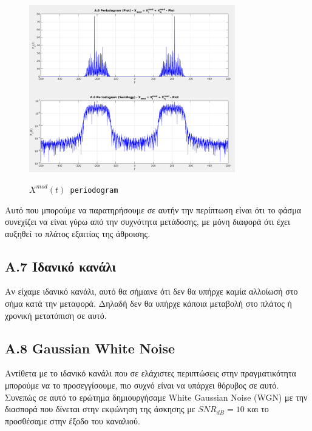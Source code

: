 \documentclass[11pt]{article}
\begin{document}
    \begin{figure}[H]
        \centering
        \includegraphics[scale=0.5, width=0.8\textwidth]{img/A6_mod_period.png} \\
        \caption{\texttt{$X^{mod}(t)$ periodogram}}
    \end{figure}
    
    \newpage \par \noindent
    Αυτό που μπορούμε να παρατηρήσουμε σε αυτήν την περίπτωση είναι ότι το φάσμα συνεχίζει να είναι γύρω από την συχνότητα μετάδοσης, με μόνη διαφορά ότι έχει αυξηθεί το πλάτος εξαιτίας της άθροισης.
    
    \subsection*{A.7 Ιδανικό κανάλι}
    Αν είχαμε ιδανικό κανάλι, αυτό θα σήμαινε ότι δεν θα υπήρχε καμία αλλοίωσή στο σήμα κατά την μεταφορά. 
    Δηλαδή δεν θα υπήρχε κάποια μεταβολή στο πλάτος ή χρονική μετατόπιση σε αυτό.

    \subsection*{A.8 Gaussian White Noise}
    Αντίθετα με το ιδανικό κανάλι που σε ελάχιστες περιπτώσεις στην πραγματικότητα μπορούμε να το προσεγγίσουμε, πιο συχνό είναι να υπάρχει θόρυβος σε αυτό.
    Συνεπώς σε αυτό το ερώτημα δημιουργήσαμε White Gaussian Noise (WGN) με την διασπορά που δίνεται στην εκφώνηση της άσκησης με $SNR_{dB}=10$ και το προσθέσαμε στην έξοδο του καναλιού.
    
\end{document}
